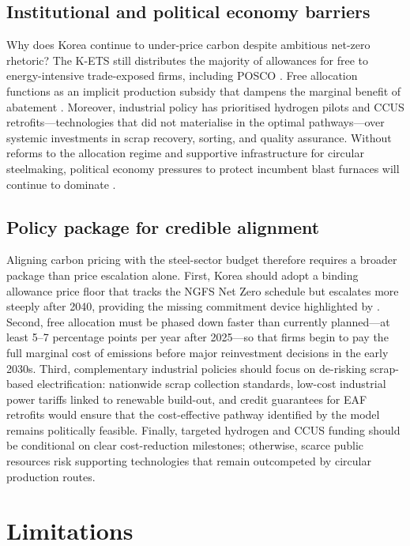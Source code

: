 \documentclass[preprint,1p,authoryear]{elsarticle}
\begin{document}
\subsection{Institutional and political economy barriers}

Why does Korea continue to under-price carbon despite ambitious net-zero rhetoric? The K-ETS still distributes the majority of allowances for free to energy-intensive trade-exposed firms, including POSCO \citep{kim2021kets, ICAP2024}. Free allocation functions as an implicit production subsidy that dampens the marginal benefit of abatement \citep{neuhoff2012inclusion}. Moreover, industrial policy has prioritised hydrogen pilots and CCUS retrofits—technologies that did not materialise in the optimal pathways—over systemic investments in scrap recovery, sorting, and quality assurance. Without reforms to the allocation regime and supportive infrastructure for circular steelmaking, political economy pressures to protect incumbent blast furnaces will continue to dominate \citep{MaterialEconomics2019}.

\subsection{Policy package for credible alignment}

Aligning carbon pricing with the steel-sector budget therefore requires a broader package than price escalation alone. First, Korea should adopt a binding allowance price floor that tracks the NGFS Net Zero schedule but escalates more steeply after 2040, providing the missing commitment device highlighted by \citet{fowlie2016carbon}. Second, free allocation must be phased down faster than currently planned—at least 5--7 percentage points per year after 2025—so that firms begin to pay the full marginal cost of emissions before major reinvestment decisions in the early 2030s. Third, complementary industrial policies should focus on de-risking scrap-based electrification: nationwide scrap collection standards, low-cost industrial power tariffs linked to renewable build-out, and credit guarantees for EAF retrofits would ensure that the cost-effective pathway identified by the model remains politically feasible. Finally, targeted hydrogen and CCUS funding should be conditional on clear cost-reduction milestones; otherwise, scarce public resources risk supporting technologies that remain outcompeted by circular production routes.

\section{Limitations}
\end{document}
